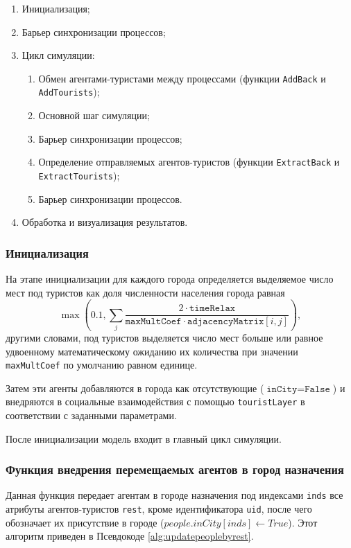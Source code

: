 \documentclass[a4paper,12pt]{article} %
\begin{document}
\begin{enumerate}
	\item Инициализация;
	\item Барьер синхронизации процессов;
	\item Цикл симуляции:
	\begin{enumerate}
		\item Обмен агентами-туристами между процессами (функции \texttt{AddBack} и \texttt{AddTourists});
		\item Основной шаг симуляции;
		\item Барьер синхронизации процессов;
		\item Определение отправляемых агентов-туристов (функции \texttt{ExtractBack} и \texttt{Extract\-Tourists});
		\item Барьер синхронизации процессов.
	\end{enumerate}
	\item Обработка и визуализация результатов.
\end{enumerate}

\subsubsection{Инициализация}
На этапе инициализации для каждого города определяется выделяемое число мест под туристов как доля численности населения города равная
\begin{displaymath}
\max\left(0.1,\sum\limits_j \frac{2\cdot\texttt{timeRelax}}{\texttt{maxMultCoef}\cdot\texttt{adjacencyMatrix}[i,j]}\right),
\end{displaymath}
другими словами, под туристов выделяется число мест больше или равное удвоенному математическому ожиданию их количества при значении \texttt{maxMultCoef} по умолчанию равном единице.

Затем эти агенты добавляются в города как отсутствующие (\(\texttt{inCity}=\texttt{False}\)) и внедряются в социальные взаимодействия с помощью \texttt{touristLayer} в соответствии с заданными параметрами. 

После инициализации модель входит в главный цикл симуляции.

\subsubsection{Функция внедрения перемещаемых агентов в город назначения}

Данная функция передает агентам в городе назначения под индексами \texttt{inds} все атрибуты агентов-туристов \texttt{rest}, кроме идентификатора \texttt{uid}, после чего обозначает их присутствие в городе (\(people.inCity[inds] \gets True\)). Этот алгоритм приведен в Псевдокоде \ref{alg:updatepeoplebyrest}.
\end{document}
